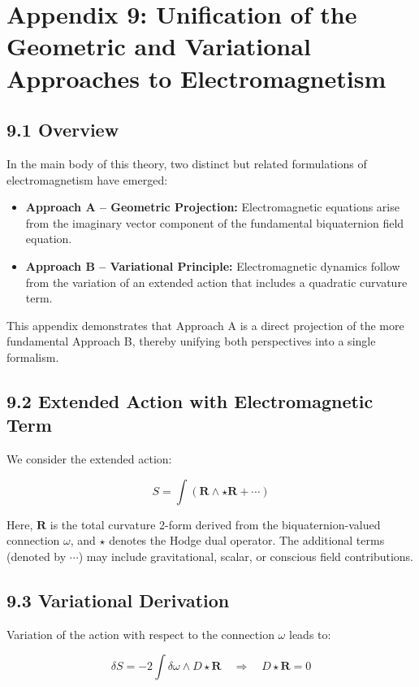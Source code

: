 
\appendix
\section*{Appendix 9: Unification of the Geometric and Variational Approaches to Electromagnetism}

\subsection*{9.1 Overview}

In the main body of this theory, two distinct but related formulations of electromagnetism have emerged:

\begin{itemize}
  \item \textbf{Approach A – Geometric Projection:} Electromagnetic equations arise from the imaginary vector component of the fundamental biquaternion field equation.
  \item \textbf{Approach B – Variational Principle:} Electromagnetic dynamics follow from the variation of an extended action that includes a quadratic curvature term.
\end{itemize}

This appendix demonstrates that Approach A is a direct projection of the more fundamental Approach B, thereby unifying both perspectives into a single formalism.

\subsection*{9.2 Extended Action with Electromagnetic Term}

We consider the extended action:

\[
S = \int \left( \mathbf{R} \wedge \star \mathbf{R} + \cdots \right)
\]

Here, \( \mathbf{R} \) is the total curvature 2-form derived from the biquaternion-valued connection \( \omega \), and \( \star \) denotes the Hodge dual operator. The additional terms (denoted by \( \cdots \)) may include gravitational, scalar, or conscious field contributions.

\subsection*{9.3 Variational Derivation}

Variation of the action with respect to the connection \( \omega \) leads to:

\[
\delta S = -2 \int \delta \omega \wedge D \star \mathbf{R} \quad \Rightarrow \quad D \star \mathbf{R} = 0
\]

